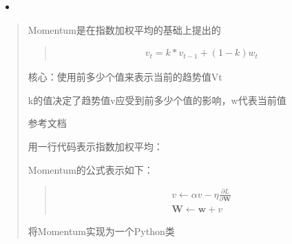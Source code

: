 \documentclass[letterpaper,10pt,english]{sphinxmanual}
\begin{document}
\begin{itemize}
\item {} 

\end{itemize}
\begin{quote}

Momentum是在指数加权平均的基础上提出的

\begin{quote}
\begin{equation*}
\begin{split}v_t=k * v_{t-1} + (1-k)w_t\end{split}
\end{equation*}\end{quote}

\begin{DUlineblock}{0em}
\item[] 核心：使用前多少个值来表示当前的趋势值Vt
\item[] k的值决定了趋势值v应受到前多少个值的影响，w代表当前值
\item[] 参考文档 
\item[] 用一行代码表示指数加权平均：
\end{DUlineblock}
\begin{quote}

%
\begin{sphinxVerbatim}[commandchars=\\\{\}]
  
   
    
\end{sphinxVerbatim}
\end{quote}

Momentum的公式表示如下：
\begin{quote}
\begin{equation*}
\begin{split}v \leftarrow \alpha{v} - \eta\frac{\partial{L}}{\partial\pmb{W}}\\
\pmb{W} \leftarrow \pmb{w} + v\end{split}
\end{equation*}\end{quote}

将Momentum实现为一个Python类
\begin{quote}


\end{quote}
\end{quote}
\end{document}
